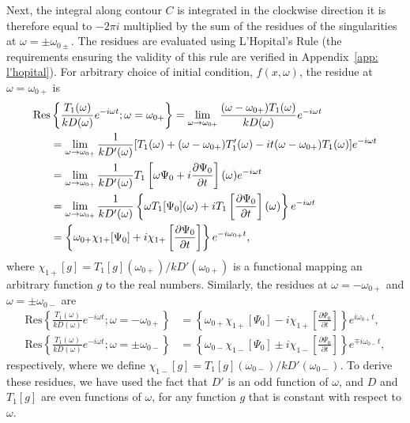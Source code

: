 \documentclass[12pt, draft]{../style-files/ociamthesis}
\begin{document}
Next, the integral along contour $C$ is integrated in the clockwise direction it is therefore equal to $-2\pi i$ multiplied by the sum of the residues of the singularities at $\omega = \pm \omega_{0\pm}$. The residues are evaluated using L'Hopital's Rule (the requirements ensuring the validity of this rule are verified in Appendix~\ref{app: l'hopital}). For arbitrary choice of initial condition, $f(x,\omega)$, the residue at $\omega = \omega_{0+}$ is
\begin{align}
\mathrm{Res}&\left\{\frac{T_1(\omega)}{kD(\omega)}e^{-i\omega t}; \omega = \omega_{0+} \right\} = 
\lim_{\omega \to \omega_{0+}} \frac{(\omega - \omega_{0+})T_1(\omega)}{kD(\omega)} e^{-i\omega t} \notag \\ 
&= \lim_{\omega \to \omega_{0+}} \frac{1}{kD'(\omega)} [T_1(\omega) + (\omega - \omega_{0+})T'_1(\omega) - it(\omega - \omega_{0+})T_1(\omega)]e^{-i\omega t} \notag \\
&= \lim_{\omega \to \omega_{0+}} \frac{1}{kD'(\omega)} T_1\left[\omega \Psi_0 + i\frac{\partial \Psi_0}{\partial t}\right](\omega) e^{-i\omega t} \notag \\
&= \lim_{\omega \to \omega_{0+}} \frac{1}{kD'(\omega)} \left\{ \omega T_1[\Psi_0](\omega) + iT_1\left[\frac{\partial \Psi_0}{\partial t}\right](\omega) \right\} e^{-i\omega t} \notag \\
&= \left\{ \omega_{0+} \chi_{1+}[\Psi_0] + i\chi_{1+}\left[\frac{\partial \Psi_0}{\partial t}\right] \right\} e^{-i\omega_{0+} t},
\end{align}
where $\chi_{1+}[g] = T_1[g](\omega_{0+}) / kD'(\omega_{0+})$ is a functional mapping an arbitrary function $g$ to the real numbers. Similarly, the residues at $\omega = -\omega_{0+}$ and $\omega = \pm\omega_{0-}$ are
\begin{align}
\mathrm{Res}\left\{\frac{T_1(\omega)}{kD(\omega)}e^{-i\omega t}; \omega = -\omega_{0+} \right\} &= \left\{ \omega_{0+} \chi_{1+}[\Psi_0] - i\chi_{1+}\left[\frac{\partial \Psi_0}{\partial t}\right] \right\} e^{i\omega_{0+} t}, \\
\mathrm{Res}\left\{\frac{T_1(\omega)}{kD(\omega)}e^{-i\omega t}; \omega = \pm \omega_{0-} \right\} &= \left\{ \omega_{0-} \chi_{1-}[\Psi_0] \pm i\chi_{1-}\left[\frac{\partial \Psi_0}{\partial t}\right] \right\} e^{\mp i\omega_{0-} t},
\end{align}
respectively, where we define $\chi_{1-}[g] = T_1[g](\omega_{0-}) / kD'(\omega_{0-})$. To derive these residues, we have used the fact that $D'$ is an odd function of $\omega$, and $D$ and $T_1[g]$ are even functions of $\omega$, for any function $g$ that is constant with respect to $\omega$.
\end{document}
